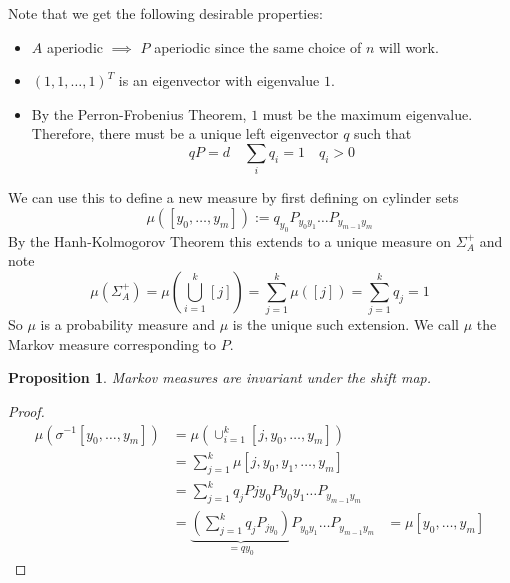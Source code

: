\documentclass[11pt]{article}
\newcommand{\defeq}{:=}
\newcommand{\mdf}[1]{{\color{red} #1}}
\newtheorem{prop}{Proposition}[section]
\begin{document}
Note that we get the following desirable properties:
\begin{itemize}
	\item $A$ aperiodic $\implies$ $P$ aperiodic since the same choice of $n$ will work.
	\item $(1, 1, \dots, 1)^T$ is an eigenvector with eigenvalue $1$.
	\item By the Perron-Frobenius Theorem, $1$ must be the maximum eigenvalue.
		Therefore, there must be a unique left eigenvector $q$ such that
		\[
			qP = d \quad \sum_{i}q_i = 1\quad q_i >0
		\]
\end{itemize}
We can use this to define a new measure by first defining on cylinder sets
\[
	\mu(\left[ y_0, \dots, y_m \right]) \defeq q_{y_0}P_{y_0 y_1}\dots P_{y_{m-1}y_m}
\]
By the Hanh-Kolmogorov Theorem this extends to a unique measure on $\Sigma_A^+$ and note
\[
	\mu(\Sigma_A^+)=\mu\left( \bigcup_{i=1}^k [j] \right)=\sum_{j=1}^k \mu( \left[ j\right]) = \sum_{j=1}^k q_j =1
\]
So $\mu$ is a probability measure and $\mu$ is the unique such extension.
We call $\mu$ the \mdf{Markov measure corresponding to $P$}.

\begin{prop}
Markov measures are invariant under the shift map.
\end{prop}

\begin{proof}
\begin{align*}
	\mu(\sigma^{-1}[y_0, \dots, y_m]) &= \mu\left( \cup_{i=1}^k [j, y_0, \dots, y_m]\right) \\
									  &= \sum_{j=1}^k\mu[j, y_0, y_1, \dots, y_m] \\
									  &= \sum_{j=1}^k q_jP{j y_0} P{y_0 y_1} \dots P_{y_{m-1} y_m} \\
									  &= \underbrace{\left( \sum_{j=1}^k q_j P_{j y_0}\right)}_{=qy_0}P_{y_0 y_1} \dots P_{y_{m-1} y_m}
									  &= \mu[y_0, \dots, y_m]
\end{align*}
\end{proof}
\end{document}
